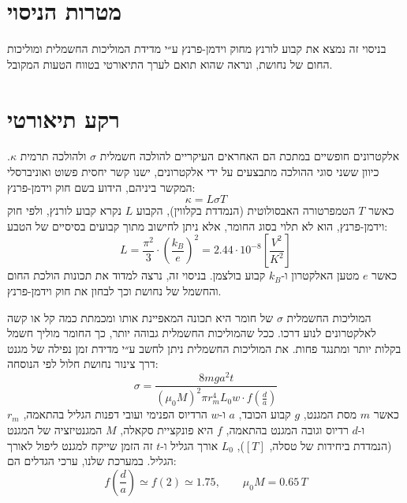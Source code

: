 \documentclass[10pt,a4paper]{article}
\newcommand{\flagged}[1]{\textcolor{red}{#1}}
\begin{document}

\setcounter{page}{1}

\section*{מטרות הניסוי}
בניסוי זה נמצא את קבוע לורנץ מחוק וידמן-פרנץ ע״י מדידת המוליכות החשמלית ומוליכות החום של נחושת, ונראה שהוא תואם לערך התיאורטי בטווח הטעות המקובל.

\section*{רקע תיאורטי}

אלקטרונים חופשיים במתכת הם האחראים העיקריים להולכה חשמלית $\sigma$ ולהולכה תרמית $\kappa$. כיוון ששני סוגי ההולכה מתבצעים על ידי אלקטרונים, ישנו קשר יחסית פשוט ואוניברסלי המקשר ביניהם, הידוע בשם חוק וידמן-פרנץ:
\begin{equation}\label{eq:wf}
\kappa = L \sigma T
\end{equation}
כאשר $T$ הטמפרטורה האבסולוטית (הנמדדת בקלווין), הקבוע $L$ נקרא קבוע לורנץ, ולפי חוק וידמן-פרנץ, הוא לא תלוי בסוג החומר, אלא ניתן לחישוב מתוך קבועים בסיסיים של הטבע:
\[
L = \frac{\pi^2}{3} \cdot \left(\frac{k_B}{e}\right)^2 = 2.44 \cdot 10^{-8} \left[\frac{V^2}{K^2}\right]
\]
כאשר $e$ מטען האלקטרון ו-$k_B$ קבוע בולצמן. בניסוי זה, נרצה למדוד את תכונות הולכת החום והחשמל של נחושת וכך לבחון את חוק וידמן-פרנץ.

המוליכות החשמלית $\sigma$ של חומר היא תכונה המאפיינת אותו ומכמתת כמה קל או קשה לאלקטרונים לנוע דרכו. ככל שהמוליכות החשמלית גבוהה יותר, כך החומר מוליך חשמל בקלות יותר ומתנגד פחות. את המוליכות החשמלית ניתן לחשב ע״י מדידת זמן נפילה של מגנט דרך צינור נחושת חלול לפי הנוסחה:
\begin{equation}\label{eq:sigma}
\sigma = \frac{8 m g a^2 t}{(\mu_0 M)^2 \pi r_m^4 L_0 w \cdot f\left(\frac{d}{a}\right)}
\end{equation}
כאשר $m$ מסת המגנט, $g$ קבוע הכובד, $a$ ו-$w$ הרדיוס הפנימי ועובי דפנות הגליל בהתאמה, $r_m$ ו-$d$ רדיוס וגובה המגנט בהתאמה, $f$ היא פונקציית סקאלה, $M$ המגנטיזציה של המגנט (הנמדדת ביחידות של טסלה, $[T]$), $L_0$ אורך הגליל ו-$t$ זה הזמן שייקח למגנט ליפול לאורך הגליל. במערכת שלנו, ערכי הגדלים הם:
\[
f\left(\frac{d}{a}\right) \simeq f(2) \simeq 1.75, \qquad \mu_0 M = 0.65\,T
\]
\end{document}

